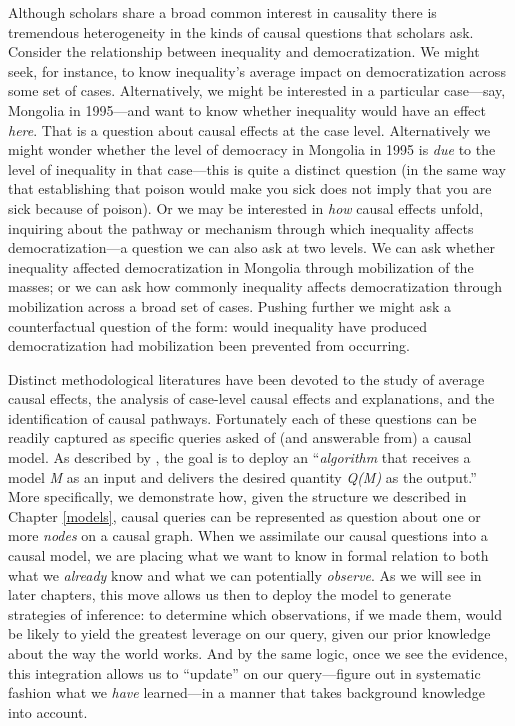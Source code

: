 \documentclass[
  12pt,
]{book}
\begin{document}
Although scholars share a broad common interest in causality there is tremendous heterogeneity in the kinds of causal questions that scholars ask. Consider the relationship between inequality and democratization. We might seek, for instance, to know inequality's average impact on democratization across some set of cases. Alternatively, we might be interested in a particular case---say, Mongolia in 1995---and want to know whether inequality would have an effect \emph{here}. That is a question about causal effects at the case level. Alternatively we might wonder whether the level of democracy in Mongolia in 1995 is \emph{due} to the level of inequality in that case---this is quite a distinct question (in the same way that establishing that poison would make you sick does not imply that you are sick because of poison). Or we may be interested in \emph{how} causal effects unfold, inquiring about the pathway or mechanism through which inequality affects democratization---a question we can also ask at two levels. We can ask whether inequality affected democratization in Mongolia through mobilization of the masses; or we can ask how commonly inequality affects democratization through mobilization across a broad set of cases. Pushing further we might ask a counterfactual question of the form: would inequality have produced democratization had mobilization been prevented from occurring.

Distinct methodological literatures have been devoted to the study of average causal effects, the analysis of case-level causal effects and explanations, and the identification of causal pathways. Fortunately each of these questions can be readily captured as specific queries asked of (and answerable from) a causal model. As described by \citet{judea2010introduction}, the goal is to deploy an ``\emph{algorithm} that receives a model \emph{M} as an input and delivers the desired quantity \emph{Q(M)} as the output.'' More specifically, we demonstrate how, given the structure we described in Chapter \ref{models}, causal queries can be represented as question about one or more \emph{nodes} on a causal graph. When we assimilate our causal questions into a causal model, we are placing what we want to know in formal relation to both what we \emph{already} know and what we can potentially \emph{observe}. As we will see in later chapters, this move allows us then to deploy the model to generate strategies of inference: to determine which observations, if we made them, would be likely to yield the greatest leverage on our query, given our prior knowledge about the way the world works. And by the same logic, once we see the evidence, this integration allows us to ``update'' on our query---figure out in systematic fashion what we \emph{have} learned---in a manner that takes background knowledge into account.
\end{document}
